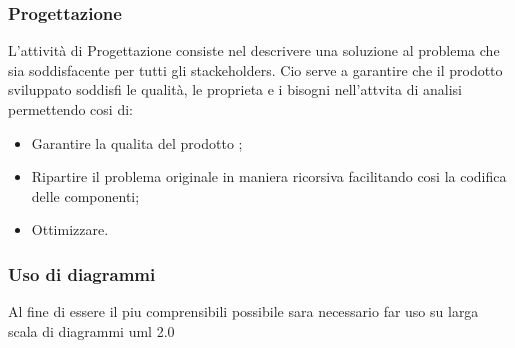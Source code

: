 \documentclass[a4paper,12pt]{article}
\begin{document}
\subsubsection{Progettazione}
L'attività di Progettazione consiste nel descrivere una soluzione al problema che sia soddisfacente per tutti gli stackeholders. Cio serve a garantire che il prodotto sviluppato soddisfi le qualità, le proprieta e i bisogni nell'attvita di analisi permettendo cosi di:
\begin{itemize}
\item Garantire la qualita del prodotto ;
\item Ripartire il problema originale in maniera ricorsiva facilitando cosi la codifica delle componenti;
\item Ottimizzare.
\end{itemize}	
\subsubsection{Uso di diagrammi}
Al fine di essere il piu comprensibili possibile sara necessario far uso su larga scala di diagrammi uml 2.0
\end{document}
